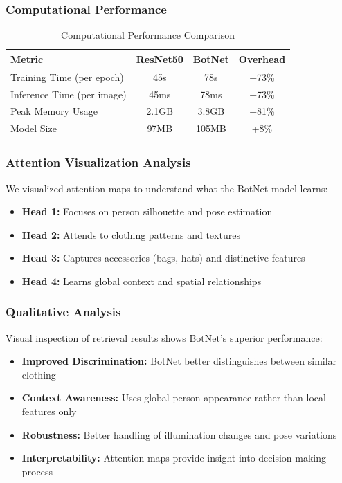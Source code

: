 \documentclass[a4paper,12pt]{article}
\begin{document}
\subsubsection*{Computational Performance}
\begin{table}[H]
    \centering
    \begin{tabular}{lccc}
        \toprule
        \textbf{Metric} & \textbf{ResNet50} & \textbf{BotNet} & \textbf{Overhead} \\
        \midrule
        Training Time (per epoch) & 45s & 78s & +73\% \\
        Inference Time (per image) & 45ms & 78ms & +73\% \\
        Peak Memory Usage & 2.1GB & 3.8GB & +81\% \\
        Model Size & 97MB & 105MB & +8\% \\
        \bottomrule
    \end{tabular}
    \caption{Computational Performance Comparison}
\end{table}

\subsubsection*{Attention Visualization Analysis}
We visualized attention maps to understand what the BotNet model learns:

\begin{itemize}
    \item \textbf{Head 1:} Focuses on person silhouette and pose estimation
    \item \textbf{Head 2:} Attends to clothing patterns and textures
    \item \textbf{Head 3:} Captures accessories (bags, hats) and distinctive features
    \item \textbf{Head 4:} Learns global context and spatial relationships
\end{itemize}

\subsubsection*{Qualitative Analysis}
Visual inspection of retrieval results shows BotNet's superior performance:

\begin{itemize}
    \item \textbf{Improved Discrimination:} BotNet better distinguishes between similar clothing
    \item \textbf{Context Awareness:} Uses global person appearance rather than local features only
    \item \textbf{Robustness:} Better handling of illumination changes and pose variations
    \item \textbf{Interpretability:} Attention maps provide insight into decision-making process
\end{itemize}
\end{document}
